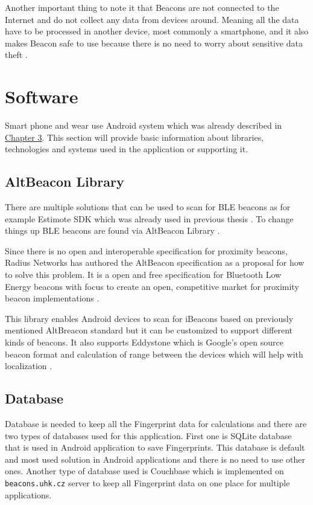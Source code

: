 Another important thing to note it that Beacons are not connected to the Internet and do not collect any data from devices around. Meaning all the data have to be processed in another device, most commonly a smartphone, and it also makes Beacon safe to use because there is no need to worry about sensitive data theft \cite{10TABB}.

\section{Software}\label{sec:Software}
Smart phone and wear use Android system which was already described in \hyperref[sec:Android]{Chapter 3}. This section will provide basic information about libraries, technologies and systems used in the application or supporting it.

\subsection{AltBeacon Library}\label{subsec:AltBeaconLibrary}
There are multiple solutions that can be used to scan for BLE beacons as for example Estimote SDK \cite{ESDKfA} which was already used in previous thesis \cite{PMRIL}. To change things up BLE beacons are found via AltBeacon Library \cite{ABL}.

Since there is no open and interoperable specification for proximity beacons, Radius Networks has authored the AltBeacon specification as a proposal for how to solve this problem. It is a open and free specification for Bluetooth Low Energy beacons with focus to create an open, competitive market for proximity beacon implementations \cite{AltB}.

This library enables Android devices to scan for iBeacons based on previously mentioned AltBreacon standard but it can be customized to support different kinds of beacons. It also supports Eddystone which is Google's open source beacon format and calculation of range between the devices which will help with localization \cite{ABL, EDDF}.

\subsection{Database}\label{subsec:Database}
Database is needed to keep all the Fingerprint data for calculations and there are two types of databases used for this application. First one is SQLite database that is used in Android application to save Fingerprints. This database is default and most used solution in Android applications and there is no need to use other ones. Another type of database used is Couchbase which is implemented on \verb|beacons.uhk.cz| server to keep all Fingerprint data on one place for multiple applications.

